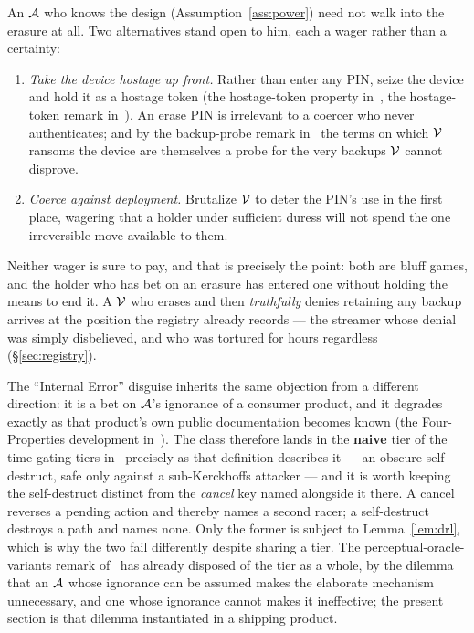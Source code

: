 \begin{remark}\label{rem:erase-bluffs}
An $\mathcal{A}$ who knows the design (Assumption~\ref{ass:power}) need not walk
into the erasure at all. Two alternatives stand open to him, each a wager rather
than a certainty:
\begin{enumerate}[nosep,leftmargin=1.6em]
  \item \emph{Take the device hostage up front.} Rather than enter any PIN,
        seize the device and hold it as a hostage token (the hostage-token property in~\cite{deadly-race},
        the hostage-token remark in~\cite{deadly-race}). An erase PIN is irrelevant to a coercer who
        never authenticates; and by the backup-probe remark in~\cite{deadly-race} the terms on
        which $\mathcal{V}$ ransoms the device are themselves a probe for the very
        backups $\mathcal{V}$ cannot disprove.
  \item \emph{Coerce against deployment.} Brutalize $\mathcal{V}$ to deter the PIN's
        use in the first place, wagering that a holder under sufficient duress
        will not spend the one irreversible move available to them.
\end{enumerate}
Neither wager is sure to pay, and that is precisely the point: both are bluff
games, and the holder who has bet on an erasure has entered one without holding
the means to end it. A $\mathcal{V}$ who erases and then \emph{truthfully} denies
retaining any backup arrives at the position the registry already records --- the
streamer whose denial was simply disbelieved, and who was tortured for hours
regardless~\cite{ratirl} (\S\ref{sec:registry}).
\end{remark}

The ``Internal Error'' disguise inherits the same objection from a different
direction: it is a bet on $\mathcal{A}$'s ignorance of a consumer product, and it
degrades exactly as that product's own public documentation becomes known
(the Four-Properties development in~\cite{deadly-race}). The class therefore lands in the \textbf{naive} tier of
the time-gating tiers in~\cite{deadly-race} precisely as that definition describes it --- an
obscure self-destruct, safe only against a sub-Kerckhoffs attacker --- and it is
worth keeping the self-destruct distinct from the \emph{cancel} key named
alongside it there. A cancel reverses a pending action and thereby names a second
racer; a self-destruct destroys a path and names none. Only the former is subject
to Lemma~\ref{lem:drl}, which is why the two fail differently despite sharing a
tier. The perceptual-oracle-variants remark of~\cite{deadly-race} has already disposed of the tier as a
whole, by the dilemma that an $\mathcal{A}$ whose ignorance can be assumed makes
the elaborate mechanism unnecessary, and one whose ignorance cannot makes it
ineffective; the present section is that dilemma instantiated in a shipping
product.

